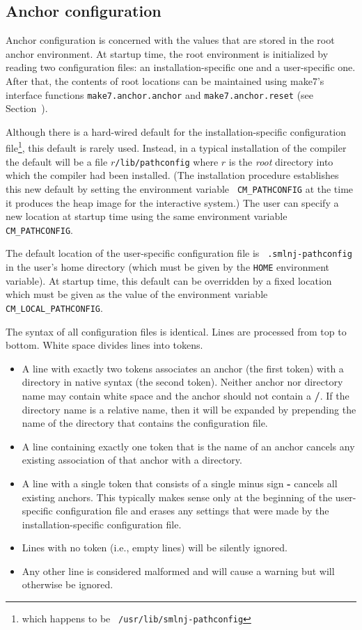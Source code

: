 \subsection{Anchor configuration}
\label{sec:anchor:config}

Anchor configuration is concerned with the values that are stored in
the root anchor environment.  At startup time, the root environment is
initialized by reading two configuration files: an
installation-specific one and a user-specific one.  After that, the
contents of root locations can be maintained using make7's interface
functions {\tt make7.anchor.anchor} and {\tt make7.anchor.reset} (see
Section~).

Although there is a hard-wired default for the installation-specific
configuration file\footnote{which happens to be {\tt
/usr/lib/smlnj-pathconfig}}, this default is rarely used.
Instead, in a typical installation of the compiler the default will be a
file $r${\tt /lib/pathconfig} where $r$ is the {\it root} directory
into which the compiler had been installed.  (The installation procedure
establishes this new default by setting the environment variable {\tt
CM\_PATHCONFIG} at the time it produces the heap image for
the interactive system.)  The user can specify a new location at
startup time using the same environment variable {\tt CM\_PATHCONFIG}.

The default location of the user-specific configuration file is {\tt
.smlnj-pathconfig} in the user's home directory (which must be given
by the {\tt HOME} environment variable).  At startup time, this
default can be overridden by a fixed location which must be given as
the value of the environment variable {\tt CM\_LOCAL\_PATHCONFIG}.

The syntax of all configuration files is identical.  Lines are
processed from top to bottom. White space divides lines into tokens.
\begin{itemize}
\item A line with exactly two tokens associates an anchor (the first
token) with a directory in native syntax (the second token).  Neither
anchor nor directory name may contain white space and the anchor
should not contain a {\bf /}.  If the directory name is a relative
name, then it will be expanded by prepending the name of the directory
that contains the configuration file.
\item A line containing exactly one token that is the name of an
anchor cancels any existing association of that anchor with a
directory.
\item A line with a single token that consists of a single minus sign
{\bf -} cancels all existing anchors.  This typically makes sense only
at the beginning of the user-specific configuration file and
erases any settings that were made by the installation-specific
configuration file.
\item Lines with no token (i.e., empty lines) will be silently ignored.
\item Any other line is considered malformed and will cause a warning
but will otherwise be ignored.
\end{itemize}

